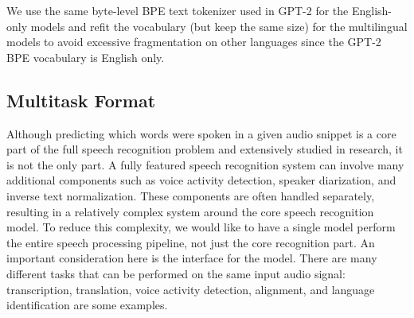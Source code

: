 \documentclass[nohyperref]{article}
\theoremstyle{plain}
\theoremstyle{definition}
\theoremstyle{remark}
\begin{document}
We use the same byte-level BPE text tokenizer used in GPT-2 \cite{sennrich2015neural,radford2019gpt2} for the English-only models and refit the vocabulary (but keep the same size) for the multilingual models to avoid excessive fragmentation on other languages since the GPT-2 BPE vocabulary is English only.

\subsection{Multitask Format}\label{sec:multitask}

Although predicting which words were spoken in a given audio snippet is a core part of the full speech recognition problem and extensively studied in research, it is not the only part. A fully featured speech recognition system can involve many additional components such as voice activity detection, speaker diarization, and inverse text normalization. These components are often handled separately, resulting in a relatively complex system around the core speech recognition model. To reduce this complexity, we would like to have a single model perform the entire speech processing pipeline, not just the core recognition part. An important consideration here is the interface for the model. There are many different tasks that can be performed on the same input audio signal: transcription, translation, voice activity detection, alignment, and language identification are some examples. 
\end{document}
